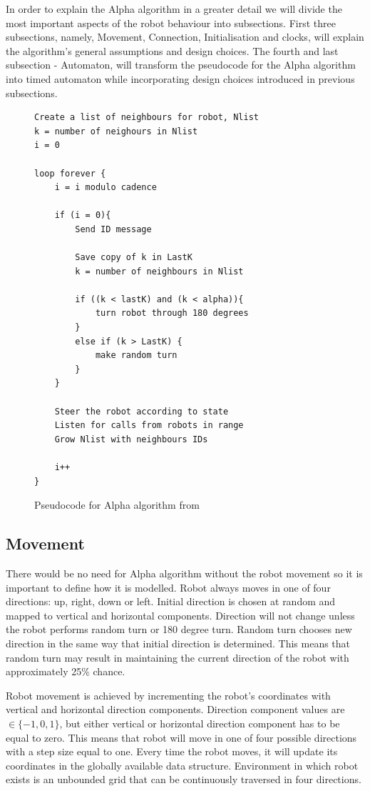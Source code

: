 In order to explain the Alpha algorithm in a greater detail we will divide the most important aspects of the robot behaviour into subsections. First three subsections, namely, Movement, Connection, Initialisation and clocks, will explain the algorithm's general assumptions and design choices. The fourth and last subsection - Automaton, will transform the pseudocode for the Alpha algorithm into timed automaton while incorporating design choices introduced in previous subsections.

\begin{figure}[H]
\caption{Pseudocode for Alpha algorithm from \cite{Minimalist_Coherent_Swarming_of_Wireless_Networked_Autonomous_Mobile_Robots}}
\begin{lstlisting}
Create a list of neighbours for robot, Nlist
k = number of neighours in Nlist
i = 0

loop forever {
	i = i modulo cadence

	if (i = 0){
		Send ID message

		Save copy of k in LastK
		k = number of neighbours in Nlist

		if ((k < lastK) and (k < alpha)){
			turn robot through 180 degrees
		}
		else if (k > LastK) {
			make random turn
		}
	}

	Steer the robot according to state
	Listen for calls from robots in range
	Grow Nlist with neighbours IDs

	i++
}
\end{lstlisting}
\label{fig:pseudocode}
\end{figure}


\subsection{Movement}
There would be no need for Alpha algorithm without the robot movement so it is important to define how it is modelled. Robot always moves in one of four directions: up, right, down or left. Initial direction is chosen at random and mapped to vertical and horizontal components. Direction will not change unless the robot performs random turn or 180 degree turn. Random turn chooses new direction in the same way that initial direction is determined. This means that random turn may result in maintaining the current direction of the robot with approximately 25\% chance. 

Robot movement is achieved by incrementing the robot's coordinates with vertical and horizontal direction components. Direction component values are  $\in \{-1, 0, 1\}$, but either vertical or horizontal direction component has to be equal to zero. This means that robot will move in one of four possible directions with a step size equal to one. Every time the robot moves, it will update its coordinates in the globally available data structure. Environment in which robot exists is an unbounded grid that can be continuously traversed in four directions.

